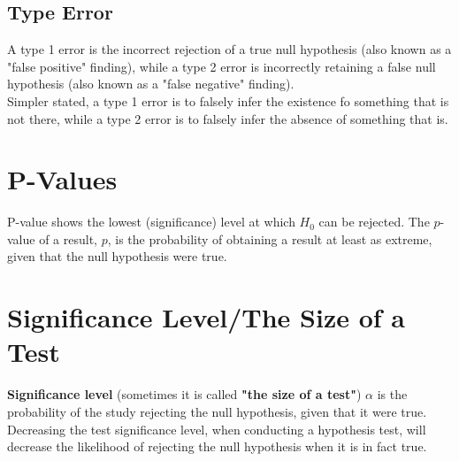 \subsection{Type Error}
A type 1 error is the incorrect rejection of a true null hypothesis (also known as a "false positive" finding), while a type 2 error is incorrectly retaining a false null hypothesis (also known as a "false negative" finding).\\
Simpler stated, a type 1 error is to falsely infer the existence fo something that is not there, while a type 2 error is to falsely infer the absence of something that is.

\section{P-Values}
P-value shows the lowest (significance) level at which $H_{0}$ can be rejected.
The $p$-value of a result, $p$, is the probability of obtaining a result at least as extreme, given that the null hypothesis were true.

\section{Significance Level/The Size of a Test}
\textbf{\color{blue}Significance level} (sometimes it is called \textbf{\color{blue}"the size of a test"}) $\alpha$ is the probability of the study rejecting the null hypothesis, given that it were true.\\
Decreasing the test significance level, when conducting a hypothesis test, will decrease the likelihood of rejecting the null hypothesis when it is in fact true.

